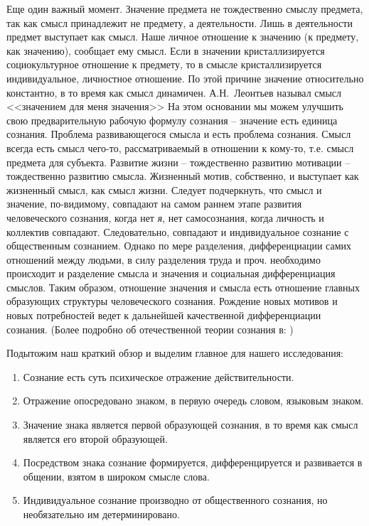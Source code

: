 Еще один важный момент. Значение предмета не тождественно смыслу предмета,
так как смысл принадлежит не предмету, а деятельности.\autocite{leontev2005lectures}
Лишь в деятельности предмет выступает как смысл.
Наше личное отношение к значению (к предмету, как значению), сообщает ему смысл.
Если в значении кристаллизируется социокультурное отношение к предмету,
то в смысле кристаллизируется индивидуальное, личностное отношение.
По этой причине значение относительно константно, в то время как смысл динамичен.
А.Н.~Леонтьев называл смысл <<значением для меня значения>>\autocite{leontev2005lectures}
На этом основании мы можем улучшить свою предварительную рабочую формулу сознания --
значение есть единица сознания. Проблема развивающегося смысла и есть проблема
сознания. Смысл всегда есть смысл чего-то, рассматриваемый в отношении к кому-то,
т.е. смысл предмета для субъекта. Развитие жизни -- тождественно развитию мотивации --
тождественно развитию смысла. Жизненный мотив, собственно, и выступает как жизненный
смысл, как смысл жизни. Следует подчеркнуть, что смысл и значение, по-видимому,
совпадают на самом раннем этапе развития человеческого сознания, когда нет \emph{я},
нет самосознания, когда личность и коллектив совпадают. Следовательно, совпадают и
индивидуальное сознание с общественным сознанием. Однако по мере разделения,
дифференциации самих отношений между людьми, в силу разделения труда и проч.
необходимо происходит и разделение смысла и значения и социальная дифференциация
смыслов. Таким образом, отношение значения и смысла есть отношение главных
образующих структуры человеческого сознания. Рождение новых мотивов и новых
потребностей ведет к дальнейшей качественной дифференциации сознания.
(Более подробно об отечественной теории сознания в: )

Подытожим наш краткий обзор и выделим главное для нашего исследования:
\begin{enumerate}
\item Сознание есть суть психическое отражение действительности.
\item Отражение опосредовано знаком, в первую очередь словом, языковым знаком.
\item Значение знака является первой образующей сознания, в то время как смысл
  является его второй образующей.
\item Посредством знака сознание формируется, дифференцируется и развивается
  в общении, взятом в широком смысле слова.
\item Индивидуальное сознание производно от общественного сознания,
  но необязательно им детерминировано.
\end{enumerate}

